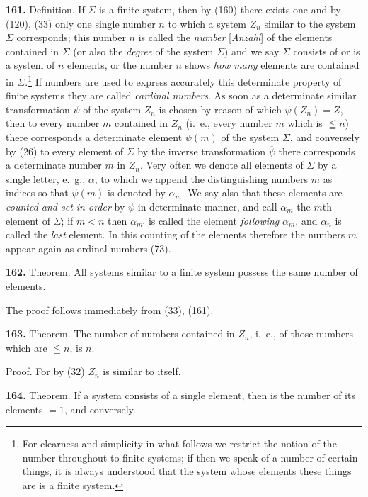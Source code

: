 \documentclass[oneside]{book}
\newcommand\mypara{\medskip\textbf}
\begin{document}
\mypara{161.} Definition.  If $\Sigma$ is a finite system, then by
(160) there exists one and by (120), (33) only one
single number $n$ to which a system $Z_n$ similar to the
system $\Sigma$ corresponds; this number $n$ is called the
\textit{number} [\textit{Anzahl}] of the elements contained in $\Sigma$ (or
also the \textit{degree} of the system $\Sigma$) and we say $\Sigma$ consists
of or is a system of $n$ elements, or the number $n$ shows
\textit{how many} elements are contained in $\Sigma$.\footnote
  {For clearness and simplicity in what follows we restrict the notion of
  the number throughout to finite systems; if then we speak of a number of certain
  things, it is always understood that the system whose elements these
  things are is a finite system.}
If numbers
are used to express accurately this determinate property
of finite systems they are called \textit{cardinal numbers}.
As soon as a determinate similar transformation $\psi$ of
the system $Z_n$ is chosen by reason of which $\psi(Z_n)=Z$,
then to every number $m$ contained in $Z_n$ (i.~e., every
number $m$ which is $\leqq n$) there corresponds a determinate
element $\psi(m)$ of the system $\Sigma$, and conversely
by (26) to every element of $\Sigma$ by the inverse transformation
$\overline{\psi}$ there corresponds a determinate number
$m$ in $Z_n$. Very often we denote all elements of $\Sigma$ by a
single letter, e.~g., $\alpha$, to which we append the distinguishing
numbers $m$ as indices so that $\psi(m)$ is denoted
by $\alpha_m$. We say also that these elements are \textit{counted
and set in order} by $\psi$ in determinate manner, and call
$\alpha_m$ the $m$th element of $\Sigma$; if $m<n$ then $\alpha_{m'}$ is called
the element \textit{following} $\alpha_m$, and $\alpha_n$ is called the \textit{last} element.
In this counting of the elements therefore the
numbers $m$ appear again as ordinal numbers (73).

\mypara{162.} Theorem. All systems similar to a finite system
possess the same number of elements.

The proof follows immediately from (33), (161).

\mypara{163.} Theorem. The number of numbers contained
in $Z_n$, i.~e., of those numbers which are $\leqq n$, is $n$.


Proof. For by (32) $Z_n$ is similar to itself.

\mypara{164.} Theorem. If a system consists of a single
element, then is the number of its elements $=1$, and
conversely.
\end{document}

